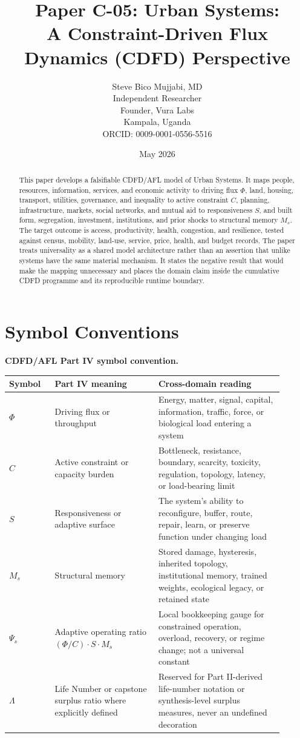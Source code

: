 \documentclass[11pt,a4paper]{article}
\title{\textbf{Paper C-05: Urban Systems:\\ A Constraint-Driven Flux Dynamics (CDFD) Perspective}}
\author{Steve Bico Mujjabi, MD\\
\small Independent Researcher\\
\small Founder, Vura Labs\\
\small Kampala, Uganda\\
\small ORCID: 0009-0001-0556-5516}
\date{May 2026}
\begin{document}
\maketitle


\begin{abstract}
This paper develops a falsifiable CDFD/AFL model of Urban Systems. It maps people, resources, information, services, and economic activity to driving flux $\Phi$, land, housing, transport, utilities, governance, and inequality to active constraint $C$, planning, infrastructure, markets, social networks, and mutual aid to responsiveness $S$, and built form, segregation, investment, institutions, and prior shocks to structural memory $M_s$. The target outcome is access, productivity, health, congestion, and resilience, tested against census, mobility, land-use, service, price, health, and budget records. The paper treats universality as a shared model architecture rather than an assertion that unlike systems have the same material mechanism. It states the negative result that would make the mapping unnecessary and places the domain claim inside the cumulative CDFD programme and its reproducible runtime boundary.
\end{abstract}

\section*{Symbol Conventions}

\noindent\textbf{CDFD/AFL Part IV symbol convention.}
\begin{center}
{\small
\begin{tabular}{p{0.15\linewidth}p{0.34\linewidth}p{0.41\linewidth}}
\hline
Symbol & Part IV meaning & Cross-domain reading \\
\hline
$\Phi$ & Driving flux or throughput & Energy, matter, signal, capital, information, traffic, force, or biological load entering a system \\
$C$ & Active constraint or capacity burden & Bottleneck, resistance, boundary, scarcity, toxicity, regulation, topology, latency, or load-bearing limit \\
$S$ & Responsiveness or adaptive surface & The system's ability to reconfigure, buffer, route, repair, learn, or preserve function under changing load \\
$M_s$ & Structural memory & Stored damage, hysteresis, inherited topology, institutional memory, trained weights, ecological legacy, or retained state \\
$\Psi_s$ & Adaptive operating ratio $(\Phi/C)\cdot S\cdot M_s$ & Local bookkeeping gauge for constrained operation, overload, recovery, or regime change; not a universal constant \\
$\Lambda$ & Life Number or capstone surplus ratio where explicitly defined & Reserved for Part II-derived life-number notation or synthesis-level surplus measures, never an undefined decoration \\
\hline
\end{tabular}
}
\end{center}
\end{document}
